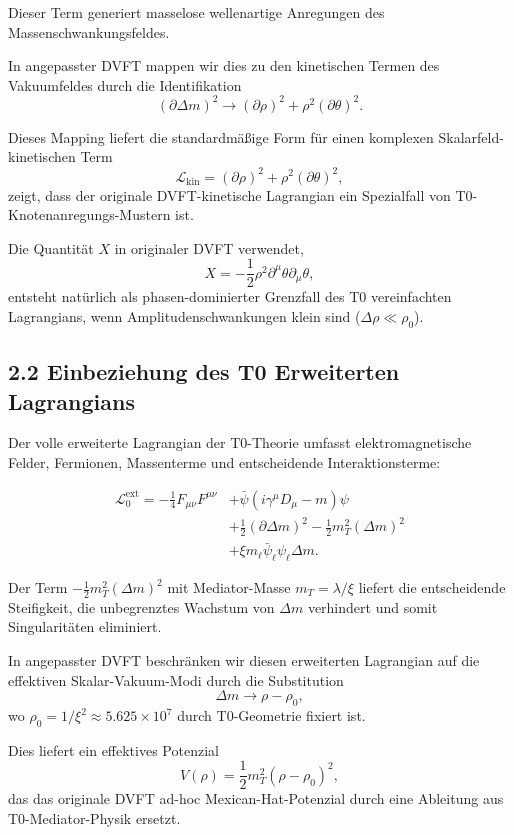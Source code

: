 	Dieser Term generiert masselose wellenartige Anregungen des Massenschwankungsfeldes.
	
	In angepasster DVFT mappen wir dies zu den kinetischen Termen des Vakuumfeldes durch die Identifikation
	\[
	(\partial \Delta m)^2 \to (\partial \rho)^2 + \rho^2 (\partial \theta)^2.
	\]
	
	Dieses Mapping liefert die standardmäßige Form für einen komplexen Skalarfeld-kinetischen Term
	\[
	\mathcal{L}_{\text{kin}} = (\partial \rho)^2 + \rho^2 (\partial \theta)^2,
	\]
	zeigt, dass der originale DVFT-kinetische Lagrangian ein Spezialfall von T0-Knotenanregungs-Mustern ist.
	
	Die Quantität $X$ in originaler DVFT verwendet,
	\[
	X = -\frac{1}{2} \rho^2 \partial^\mu \theta \partial_\mu \theta,
	\]
	entsteht natürlich als phasen-dominierter Grenzfall des T0 vereinfachten Lagrangians, wenn Amplitudenschwankungen klein sind ($\Delta \rho \ll \rho_0$).
	
	\subsection{2.2 Einbeziehung des T0 Erweiterten Lagrangians}
	
	Der volle erweiterte Lagrangian der T0-Theorie umfasst elektromagnetische Felder, Fermionen, Massenterme und entscheidende Interaktionsterme:

\[
\begin{aligned}
	\mathcal{L}_0^{\text{ext}} = -\frac{1}{4} F_{\mu\nu}F^{\mu\nu} &+ \bar{\psi}(i\gamma^\mu D_\mu - m)\psi \\
	&+ \frac{1}{2}(\partial \Delta m)^2 - \frac{1}{2} m_T^2 (\Delta m)^2 \\
	&+ \xi m_\ell \bar{\psi}_\ell \psi_\ell \Delta m.
\end{aligned}
\]
	
	Der Term $-\frac{1}{2} m_T^2 (\Delta m)^2$ mit Mediator-Masse $m_T = \lambda / \xi$ liefert die entscheidende Steifigkeit, die unbegrenztes Wachstum von $\Delta m$ verhindert und somit Singularitäten eliminiert.
	
	In angepasster DVFT beschränken wir diesen erweiterten Lagrangian auf die effektiven Skalar-Vakuum-Modi durch die Substitution
	\[
	\Delta m \to \rho - \rho_0,
	\]
	wo $\rho_0 = 1/\xi^2 \approx 5.625 \times 10^7$ durch T0-Geometrie fixiert ist.
	
	Dies liefert ein effektives Potenzial
	\[
	V(\rho) = \frac{1}{2} m_T^2 (\rho - \rho_0)^2,
	\]
	das das originale DVFT ad-hoc Mexican-Hat-Potenzial durch eine Ableitung aus T0-Mediator-Physik ersetzt.
	
